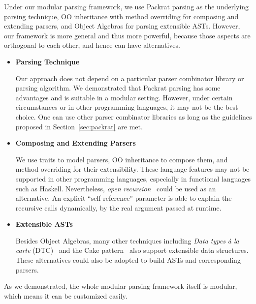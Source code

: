 Under our modular parsing framework, we use Packrat parsing as the underlying parsing technique, OO inheritance with method overriding for composing and extending parsers, and Object Algebras for parsing extensible ASTs. However, our framework is more general and thus more powerful, because those aspects are orthogonal to each other, and hence can have alternatives.

\begin{itemize}

\item {\bf Parsing Technique}

Our approach does not depend on a particular parser combinator library
or parsing algorithm. We demonstrated that Packrat parsing has some
advantages and is suitable in a modular setting. However, under
certain circumstances or in other programming languages, it may not be
the best choice. One can use other parser combinator libraries as long
as the guidelines proposed in Section~\ref{sec:packrat} are met.

\item {\bf Composing and Extending Parsers}

  We use traits to model parsers, OO inheritance to compose them, and
  method overriding for their extensibility. These language features
  may not be supported in other programming languages, especially in
  functional languages such as Haskell. Nevertheless, \textit{open
    recursion}~\cite{CookThesis} could be used as an alternative. An explicit
  ``self-reference'' parameter is able to explain the recursive calls
  dynamically, by the real argument passed at runtime.

\item {\bf Extensible ASTs}

Besides Object Algebras, many other techniques including \textit{Data
  types à la carte} (DTC)~\cite{swierstra2008data} and the Cake pattern~\cite{odersky2005independently} also support extensible data structures. These alternatives could also be adopted to build ASTs and corresponding parsers.

\end{itemize}

As we demonstrated, the whole modular parsing framework itself is
modular, which means it can be customized easily.
